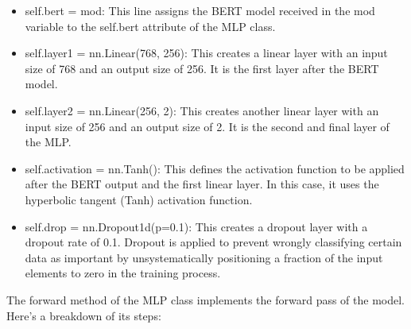 \begin{itemize}
    \item self.bert = mod: This line assigns the BERT model received in the mod variable to the self.bert attribute of the MLP class.

    \item self.layer1 = nn.Linear(768, 256): This creates a linear layer with an input size of 768 and an output size of 256. It is the first layer after the BERT model.

    \item self.layer2 = nn.Linear(256, 2): This creates another linear layer with an input size of 256 and an output size of 2. It is the second and final layer of the MLP.

    \item self.activation = nn.Tanh(): This defines the activation function to be applied after the BERT output and the first linear layer. In this case, it uses the hyperbolic tangent (Tanh) activation function.

    \item self.drop = nn.Dropout1d(p=0.1): This creates a dropout layer with a dropout rate of 0.1. Dropout is applied to prevent wrongly classifying certain data as important by unsystematically positioning a fraction of the input elements to zero in the training process.
    
\end{itemize}


The forward method of the MLP class implements the forward pass of the model. Here's a breakdown of its steps:

